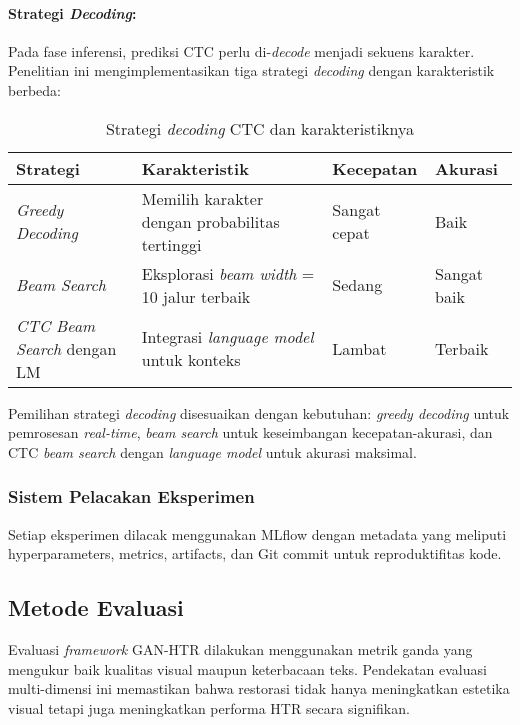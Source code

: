 \documentclass[12pt,a4paper]{article}
\begin{document}
\paragraph{Strategi \textit{Decoding}:}
Pada fase inferensi, prediksi CTC perlu di-\textit{decode} menjadi sekuens karakter. Penelitian ini mengimplementasikan tiga strategi \textit{decoding} dengan karakteristik berbeda:

\begin{table}[H]
\centering
\caption{Strategi \textit{decoding} CTC dan karakteristiknya}
\label{tab:ctc-decoding}
\small
\begin{tabular}{|l|p{4cm}|p{3.5cm}|p{3cm}|}
\hline
\textbf{Strategi} & \textbf{Karakteristik} & \textbf{Kecepatan} & \textbf{Akurasi} \\ \hline
\textit{Greedy Decoding} & Memilih karakter dengan probabilitas tertinggi & Sangat cepat & Baik \\ \hline
\textit{Beam Search} & Eksplorasi \textit{beam width} = 10 jalur terbaik & Sedang & Sangat baik \\ \hline
\textit{CTC Beam Search} dengan LM & Integrasi \textit{language model} untuk konteks & Lambat & Terbaik \\ \hline
\end{tabular}
\end{table}

Pemilihan strategi \textit{decoding} disesuaikan dengan kebutuhan: \textit{greedy decoding} untuk pemrosesan \textit{real-time}, \textit{beam search} untuk keseimbangan kecepatan-akurasi, dan CTC \textit{beam search} dengan \textit{language model} untuk akurasi maksimal.

\subsubsection{Sistem Pelacakan Eksperimen}
Setiap eksperimen dilacak menggunakan MLflow dengan metadata yang meliputi hyperparameters, metrics, artifacts, dan Git commit untuk reproduktifitas kode.

\subsection{Metode Evaluasi}
\label{subsec:metode-evaluasi}

Evaluasi \textit{framework} GAN-HTR dilakukan menggunakan metrik ganda yang mengukur baik kualitas visual maupun keterbacaan teks. Pendekatan evaluasi multi-dimensi ini memastikan bahwa restorasi tidak hanya meningkatkan estetika visual tetapi juga meningkatkan performa HTR secara signifikan.
\end{document}
